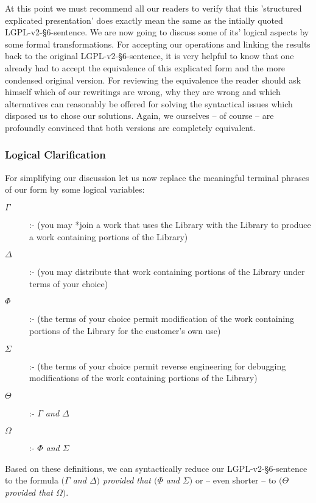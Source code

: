 At this point we must recommend all our readers to verify that this 'structured
explicated presentation' does exactly mean the same as the intially quoted
LGPL-v2-§6-sentence. We are now going to discuss some of its' logical aspects by
some formal transformations. For accepting our operations and linking the
results back to the original LGPL-v2-§6-sentence, it is very helpful to know
that one already had to accept the equivalence of this explicated form and the
more condensed original version. For reviewing the equivalence the reader should
ask himself which of our rewritings are wrong, why they are wrong and which
alternatives can reasonably be offered for solving the syntactical issues which
disposed us to chose our solutions. Again, we ourselves -- of course -- are
profoundly convinced that both versions are completely equivalent.

\subsubsection{Logical Clarification}

For simplifying our discussion let us now replace the meaningful terminal
phrases of our form by some logical variables:

\begin{description}
  \item[$\Gamma$] :- (you may *join a work that uses the Library with the
  Library to produce a work containing portions of the Library) 
  \item[$\Delta$] :- (you may distribute that work containing portions of the
  Library under terms of your choice)
  \item[$\Phi$] :- (the terms of your choice permit modification of the work 
  containing portions of the Library for the customer's own use)
  \item[$\Sigma$] :- (the terms of your choice permit reverse engineering for
  debugging modifications of the work containing portions of the Library)
  \item[$\Theta$] :- \emph{$\Gamma$ and $\Delta$}
  \item[$\Omega$] :- \emph{$\Phi$ and $\Sigma$}
\end{description}

Based on these definitions, we can syntactically reduce our LGPL-v2-§6-sentence
to the formula \emph{$(\Gamma$ and $\Delta)$ provided that $(\Phi$ and
$\Sigma)$} or -- even shorter -- to \emph{$(\Theta$ provided that
$\Omega)$}.

